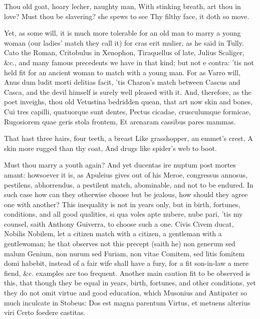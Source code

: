 {Thou old goat, hoary lecher, naughty man,
With stinking breath, art thou in love?
Must thou be slavering? she spews to see
Thy filthy face, it doth so move.

Yet, as some will, it is much more tolerable for an old man to marry a
young woman (our ladies' match they call it) for cras erit mulier, as
he said in Tully. Cato the Roman, Critobulus in Xenophon,
Tiraquellus of late, Julius Scaliger, \&c., and many famous
precedents we have in that kind; but not e contra: 'tis not held fit
for an ancient woman to match with a young man. For as Varro will, Anus
dum ludit morti delitias facit, 'tis Charon's match between
Cascus and Casca, and the devil himself is surely well pleased
with it. And, therefore, as the poet inveighs, thou old Vetustina
bedridden quean, that art now skin and bones,
Cui tres capilli, quatuorque sunt dentes,
Pectus cicadae, crusculumque formicae,
Rugosiorem quae geris stola frontem,
Et arenaram cassibus pares mammas.

That hast three hairs, four teeth, a breast
Like grasshopper, an emmet's crest,
A skin more rugged than thy coat,
And drugs like spider's web to boot.

Must thou marry a youth again? And yet ducentas ire nuptum post mortes
amant: howsoever it is, as Apuleius gives out of his Meroe,
congressus annosus, pestilens, abhorrendus, a pestilent match,
abominable, and not to be endured. In such case how can they otherwise
choose but be jealous, how should they agree one with another? This
inequality is not in years only, but in birth, fortunes, conditions,
and all good qualities, si qua voles apte nubere, nube pari, 'tis
my counsel, saith Anthony Guiverra, to choose such a one. Civis Civem
ducat, Nobilis Nobilem, let a citizen match with a citizen, a gentleman
with a gentlewoman; he that observes not this precept (saith he) non
generum sed malum Genium, non nurum sed Furiam, non vitae Comitem, sed
litis fomitem domi habebit, instead of a fair wife shall have a fury,
for a fit son-in-law a mere fiend, \&c. examples are too frequent.
Another main caution fit to be observed is this, that though they be
equal in years, birth, fortunes, and other conditions, yet they do not
omit virtue and good education, which Musonius and Antipater so much
inculcate in Stobeus:
Dos est magna parentum
Virtus, et metuens alterius viri
Certo foedere castitas.

}
